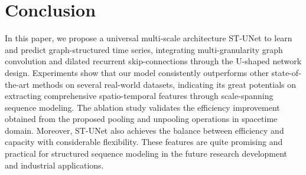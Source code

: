 \documentclass[sigconf,screen]{acmart}
\begin{document}
\section{Conclusion}
In this paper, we propose a universal multi-scale architecture ST-UNet to learn and predict graph-structured time series, integrating multi-granularity graph convolution and dilated recurrent skip-connections through the U-shaped network design. Experiments show that our model consistently outperforms other state-of-the-art methods on several real-world datasets, indicating its great potentials on extracting comprehensive spatio-temporal features through scale-spanning sequence modeling. The ablation study validates the efficiency improvement obtained from the proposed pooling and unpooling operations in spacetime domain. Moreover, ST-UNet also achieves the balance between efficiency and capacity with considerable flexibility. These features are quite promising and practical for structured sequence modeling in the future research development and industrial applications.



\end{document}
